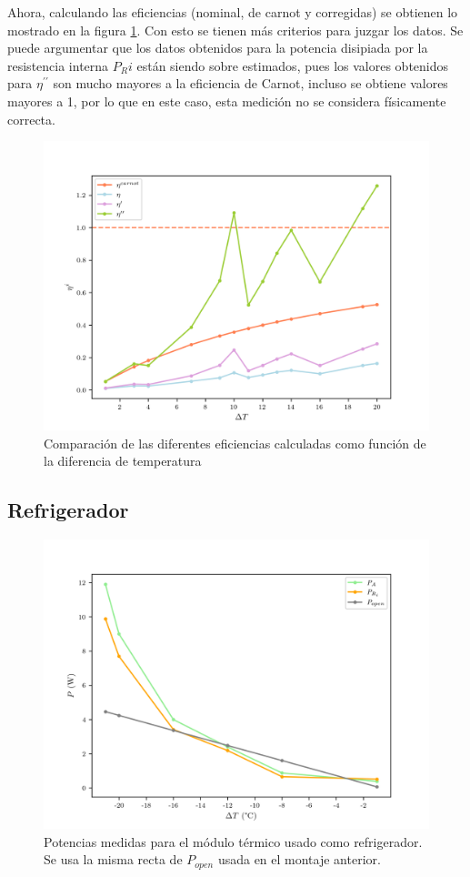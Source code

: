 Ahora, calculando las eficiencias (nominal, de carnot y corregidas) se obtienen lo mostrado en la figura \ref{fig:etas}. Con esto se tienen más criterios para juzgar los datos. Se puede argumentar que los datos obtenidos para la potencia disipiada por la resistencia interna $P_Ri$ están siendo sobre estimados, pues los valores obtenidos para $\eta^{\prime\prime}$ son mucho mayores a la eficiencia de Carnot, incluso se obtiene valores mayores a 1, por lo que en este caso, esta medición no se considera físicamente correcta.


\begin{figure}[ht]
    \centering
    \includegraphics[width = 0.8\linewidth]{img/gen_etas.png}
    \caption{Comparación de las diferentes eficiencias calculadas como función de la diferencia de temperatura}
    \label{fig:etas}
\end{figure}

\subsection{Refrigerador}

\begin{figure}[ht]
    \centering
    \includegraphics[width = 0.8\linewidth]{img/refri_powers.png}
    \caption{Potencias medidas para el módulo térmico usado como refrigerador. Se usa la misma recta de $P_{open}$ usada en el montaje anterior.}
    \label{fig:refri_powers}
\end{figure}

